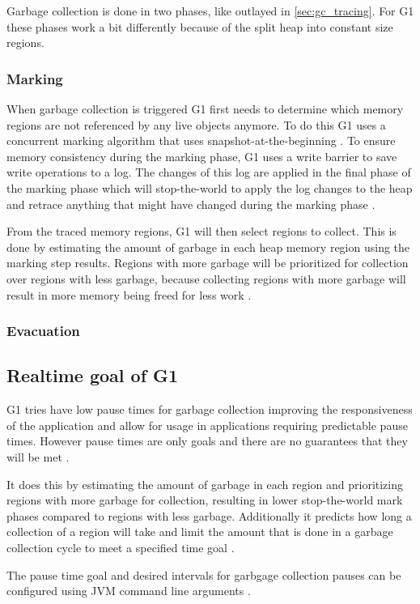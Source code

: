 Garbage collection is done in two phases, like outlayed in \autoref{sec:gc_tracing}.
For G1 these phases work a bit differently because of the split heap into constant size regions.

\subsubsection{Marking}

When garbage collection is triggered G1 first needs to determine
which memory regions are not referenced by any live objects anymore.
To do this G1 uses a concurrent marking algorithm that 
uses snapshot-at-the-beginning \cite[2.5 Concurrent Marking]{java_g1_2004}.
To ensure memory consistency during the marking phase, G1 uses a write barrier
to save write operations to a log.
The changes of this log are applied in the final phase of the marking phase
which will stop-the-world to apply the log changes to the heap
and retrace anything that might have changed during the marking phase \cite[2.2 Remembered Set Maintance]{java_g1_2004}.

From the traced memory regions, G1 will then select regions to collect.
This is done by estimating the amount of garbage in each heap memory region using the marking step results.
Regions with more garbage will be prioritized for collection over regions with less garbage,
because collecting regions with more garbage will result in more memory being freed for less work \cite[2.5 Concurrent Marking]{java_g1_2004}.

\subsubsection{Evacuation}


\subsection{Realtime goal of G1}

G1 tries have low pause times for garbage collection improving the
responsiveness of the application and allow for usage in applications
requiring predictable pause times. However pause times are only goals
and there are no guarantees that they will be met
\cite[3.2 Satisfying a Soft Real-Time Goal]{java_g1_2004}.

It does this by estimating the amount of garbage in each region and
prioritizing regions with more garbage for collection, resulting in lower stop-the-world mark phases
compared to regions with less garbage. %
Additionally it predicts how long a collection of a region will take and
limit the amount that is done in a garbage collection cycle to meet a
specified time goal \cite[3.2.1 Predicting Evacuation Pause Times]{java_g1_2004}.

The pause time goal and desired intervals for garbgage collection pauses can be configured using
JVM command line arguments \cite[Ergonomic Defaults for G1 GC]{java_g1_getting_started}.

